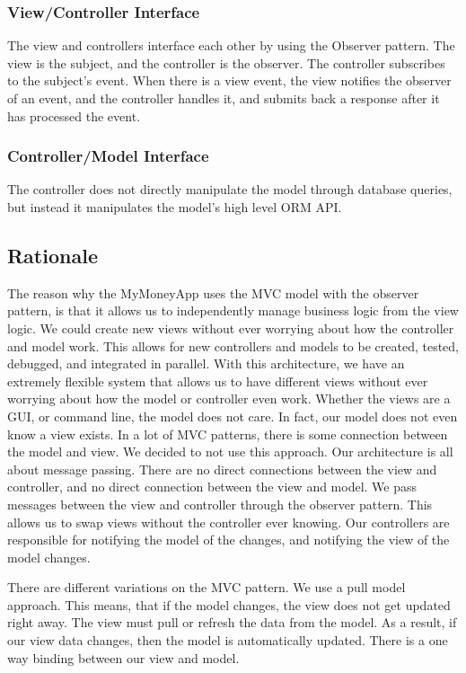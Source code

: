 \documentclass[12pt]{article}
\begin{document}
\subsubsection{View/Controller Interface}

The view and controllers interface each other by using the Observer pattern. The view is the subject, and the controller is the observer. The controller subscribes to the subject’s event.
When there is a view event, the view notifies the observer of an event, and the controller handles it, and submits back a response after it has processed the event.

\subsubsection{Controller/Model Interface}

The controller does not directly manipulate the model through database queries, but instead it manipulates the model’s high level ORM API.

\subsection{Rationale}
The reason why the MyMoneyApp uses the MVC model with the observer pattern, is that it allows us to independently manage business logic from the view logic. We could create new views without ever worrying about how the controller and model work. This allows for new controllers and models to be created, tested, debugged, and integrated in parallel. With this architecture, we have an extremely flexible system that allows us to have different views without ever worrying about how the model or controller even work. Whether the views are a GUI, or command line, the model does not care. In fact, our model does not even know a view exists. In a lot of MVC patterns, there is some connection between the model and view. We decided to not use this approach. Our architecture is all about message passing. There are no direct connections between the view and controller, and no direct connection between the view and model. We pass messages between the view and controller through the observer pattern. This allows us to swap views without the controller ever knowing. Our controllers are responsible for notifying the model of the changes, and notifying the view of the model changes.

There are different variations on the MVC pattern. We use a pull model approach. This means, that if the model changes, the view does not get updated right away. The view must pull or refresh the data from the model. As a result, if our view data changes, then the model is automatically updated. There is a one way binding between our view and model.
\end{document}
